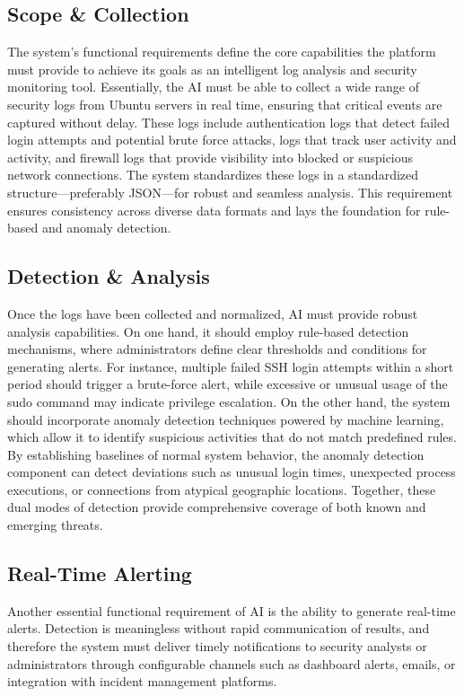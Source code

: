 \documentclass[12pt,a4paper]{report} %
\begin{document}
\subsection{Scope \& Collection}
The system's functional requirements define the core capabilities the platform must provide to achieve its goals as an intelligent log analysis and security monitoring tool. Essentially, the AI ​​must be able to collect a wide range of security logs from Ubuntu servers in real time, ensuring that critical events are captured without delay. These logs include authentication logs that detect failed login attempts and potential brute force attacks, logs that track user activity and activity, and firewall logs that provide visibility into blocked or suspicious network connections. The system standardizes these logs in a standardized structure—preferably JSON—for robust and seamless analysis. This requirement ensures consistency across diverse data formats and lays the foundation for rule-based and anomaly detection.

\subsection{Detection \& Analysis}
Once the logs have been collected and normalized, AI must provide robust analysis capabilities. On one hand, it should employ rule-based detection mechanisms, where administrators define clear thresholds and conditions for generating alerts. For instance, multiple failed SSH login attempts within a short period should trigger a brute-force alert, while excessive or unusual usage of the sudo command may indicate privilege escalation. On the other hand, the system should incorporate anomaly detection techniques powered by machine learning, which allow it to identify suspicious activities that do not match predefined rules. By establishing baselines of normal system behavior, the anomaly detection component can detect deviations such as unusual login times, unexpected process executions, or connections from atypical geographic locations. Together, these dual modes of detection provide comprehensive coverage of both known and emerging threats.

\subsection{Real-Time Alerting}
Another essential functional requirement of AI is the ability to generate real-time alerts. Detection is meaningless without rapid communication of results, and therefore the system must deliver timely notifications to security analysts or administrators through configurable channels such as dashboard alerts, emails, or integration with incident management platforms.
\end{document}
